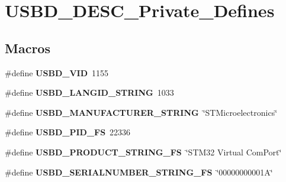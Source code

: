 \hypertarget{group___u_s_b_d___d_e_s_c___private___defines}{}\section{U\+S\+B\+D\+\_\+\+D\+E\+S\+C\+\_\+\+Private\+\_\+\+Defines}
\label{group___u_s_b_d___d_e_s_c___private___defines}
\subsection*{Macros}
\begin{DoxyCompactItemize}
\item 
\hypertarget{group___u_s_b_d___d_e_s_c___private___defines_gac5251397ce2246b546b472cd802e6d62}{}\label{group___u_s_b_d___d_e_s_c___private___defines_gac5251397ce2246b546b472cd802e6d62} 
\#define {\bfseries U\+S\+B\+D\+\_\+\+V\+ID}~1155
\item 
\hypertarget{group___u_s_b_d___d_e_s_c___private___defines_ga070dd542d4d914e86fdf103fa5fdd72f}{}\label{group___u_s_b_d___d_e_s_c___private___defines_ga070dd542d4d914e86fdf103fa5fdd72f} 
\#define {\bfseries U\+S\+B\+D\+\_\+\+L\+A\+N\+G\+I\+D\+\_\+\+S\+T\+R\+I\+NG}~1033
\item 
\hypertarget{group___u_s_b_d___d_e_s_c___private___defines_gaee0c9fd7e8265b90126028919cd863a6}{}\label{group___u_s_b_d___d_e_s_c___private___defines_gaee0c9fd7e8265b90126028919cd863a6} 
\#define {\bfseries U\+S\+B\+D\+\_\+\+M\+A\+N\+U\+F\+A\+C\+T\+U\+R\+E\+R\+\_\+\+S\+T\+R\+I\+NG}~\char`\"{}S\+T\+Microelectronics\char`\"{}
\item 
\hypertarget{group___u_s_b_d___d_e_s_c___private___defines_gaa6f9e36da39c9881963cabf42df4d216}{}\label{group___u_s_b_d___d_e_s_c___private___defines_gaa6f9e36da39c9881963cabf42df4d216} 
\#define {\bfseries U\+S\+B\+D\+\_\+\+P\+I\+D\+\_\+\+FS}~22336
\item 
\hypertarget{group___u_s_b_d___d_e_s_c___private___defines_gaa11017e20e3a2f1ef891b86212c4b730}{}\label{group___u_s_b_d___d_e_s_c___private___defines_gaa11017e20e3a2f1ef891b86212c4b730} 
\#define {\bfseries U\+S\+B\+D\+\_\+\+P\+R\+O\+D\+U\+C\+T\+\_\+\+S\+T\+R\+I\+N\+G\+\_\+\+FS}~\char`\"{}S\+T\+M32 Virtual Com\+Port\char`\"{}
\item 
\hypertarget{group___u_s_b_d___d_e_s_c___private___defines_ga0057246fa742e75846bb0467a84921fc}{}\label{group___u_s_b_d___d_e_s_c___private___defines_ga0057246fa742e75846bb0467a84921fc} 
\#define {\bfseries U\+S\+B\+D\+\_\+\+S\+E\+R\+I\+A\+L\+N\+U\+M\+B\+E\+R\+\_\+\+S\+T\+R\+I\+N\+G\+\_\+\+FS}~\char`\"{}00000000001\+A\char`\"{}

\end{DoxyCompactItemize}
